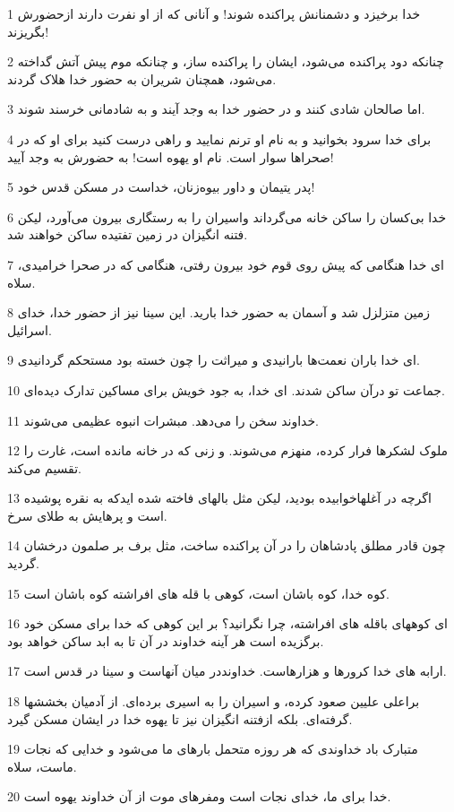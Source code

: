 \par 1 خدا برخیزد و دشمنانش پراکنده شوند! و آنانی که از او نفرت دارند ازحضورش بگریزند!
\par 2 چنانکه دود پراکنده می‌شود، ایشان را پراکنده ساز، و چنانکه موم پیش آتش گداخته می‌شود، همچنان شریران به حضور خدا هلاک گردند.
\par 3 اما صالحان شادی کنند و در حضور خدا به وجد آیند و به شادمانی خرسند شوند.
\par 4 برای خدا سرود بخوانید و به نام او ترنم نمایید و راهی درست کنید برای او که در صحراها سوار است. نام او یهوه است! به حضورش به وجد آیید!
\par 5 پدر یتیمان و داور بیوه‌زنان، خداست در مسکن قدس خود!
\par 6 خدا بی‌کسان را ساکن خانه می‌گرداند واسیران را به رستگاری بیرون می‌آورد، لیکن فتنه انگیزان در زمین تفتیده ساکن خواهند شد. 
\par 7 ‌ای خدا هنگامی که پیش روی قوم خود بیرون رفتی، هنگامی که در صحرا خرامیدی، سلاه.
\par 8 زمین متزلزل شد و آسمان به حضور خدا بارید. این سینا نیز از حضور خدا، خدای اسرائیل.
\par 9 ‌ای خدا باران نعمت‌ها بارانیدی و میراثت را چون خسته بود مستحکم گردانیدی.
\par 10 جماعت تو درآن ساکن شدند. ای خدا، به جود خویش برای مساکین تدارک دیده‌ای.
\par 11 خداوند سخن را می‌دهد. مبشرات انبوه عظیمی می‌شوند.
\par 12 ملوک لشکرها فرار کرده، منهزم می‌شوند. و زنی که در خانه مانده است، غارت را تقسیم می‌کند.
\par 13 اگرچه در آغلهاخوابیده بودید، لیکن مثل بالهای فاخته شده ایدکه به نقره پوشیده است و پرهایش به طلای سرخ.
\par 14 چون قادر مطلق پادشاهان را در آن پراکنده ساخت، مثل برف بر صلمون درخشان گردید.
\par 15 کوه خدا، کوه باشان است، کوهی با قله های افراشته کوه باشان است.
\par 16 ‌ای کوههای باقله های افراشته، چرا نگرانید؟ بر این کوهی که خدا برای مسکن خود برگزیده است هر آینه خداوند در آن تا به ابد ساکن خواهد بود.
\par 17 ارابه های خدا کرورها و هزارهاست. خداونددر میان آنهاست و سینا در قدس است.
\par 18 براعلی علیین صعود کرده، و اسیران را به اسیری برده‌ای. از آدمیان بخششها گرفته‌ای. بلکه ازفتنه انگیزان نیز تا یهوه خدا در ایشان مسکن گیرد.
\par 19 متبارک باد خداوندی که هر روزه متحمل بارهای ما می‌شود و خدایی که نجات ماست، سلاه.
\par 20 خدا برای ما، خدای نجات است ومفرهای موت از آن خداوند یهوه است.
